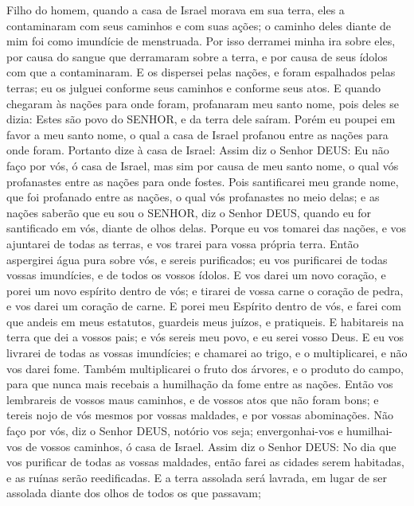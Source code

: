{  Filho do homem, quando a casa de Israel morava em sua terra, eles a contaminaram com seus caminhos e com suas ações; o caminho deles diante de mim foi como imundície de menstruada.
  Por isso derramei minha ira sobre eles, por causa do sangue que derramaram sobre a terra, e por causa de seus ídolos com que a contaminaram.
  E os dispersei pelas nações, e foram espalhados pelas terras; eu os julguei conforme seus caminhos e conforme seus atos.
  E quando chegaram às nações para onde foram, profanaram meu santo nome, pois deles se dizia: Estes são povo do SENHOR, e da terra dele saíram.
  Porém eu
{} poupei em favor a meu santo nome, o qual a casa de Israel profanou entre as nações para onde foram.
  Portanto dize à casa de Israel: Assim diz o Senhor DEUS: Eu não faço
{} por vós, ó casa de Israel, mas sim por causa de meu santo nome, o qual vós profanastes entre as nações para onde fostes.
  Pois santificarei meu grande nome, que foi profanado entre as nações, o qual vós profanastes no meio delas; e as nações saberão que eu sou o SENHOR, diz o Senhor DEUS, quando eu for santificado em vós, diante de olhos delas.
  Porque eu vos tomarei das nações, e vos ajuntarei de todas as terras, e vos trarei para vossa própria terra.
  Então aspergirei água pura sobre vós, e sereis purificados; eu vos purificarei de todas vossas imundícies, e de todos os vossos ídolos.
  E vos darei um novo coração, e porei um novo espírito dentro de vós; e tirarei de vossa carne o coração de pedra, e vos darei um coração de carne.
  E porei meu Espírito dentro de vós, e farei com que andeis em meus estatutos, guardeis meus juízos, e
{} pratiqueis.
  E habitareis na terra que dei a vossos pais; e vós sereis meu povo, e eu serei vosso Deus.
  E eu vos livrarei de todas as vossas imundícies; e chamarei ao trigo, e o multiplicarei, e não vos darei fome.
  Também multiplicarei o fruto dos árvores, e o produto do campo, para que nunca mais recebais a humilhação da fome entre as nações.
  Então vos lembrareis de vossos maus caminhos, e de vossos atos que não foram bons; e tereis nojo de vós mesmos por vossas maldades, e por vossas abominações.
  Não faço
{} por vós, diz o Senhor DEUS, notório vos seja; envergonhai-vos e humilhai-vos de vossos caminhos, ó casa de Israel.
  Assim diz o Senhor DEUS: No dia que vos purificar de todas as vossas maldades, então farei as cidades serem habitadas, e as ruínas serão reedificadas.
  E a terra assolada será lavrada, em lugar de ser assolada diante dos olhos de todos os que passavam;
}
